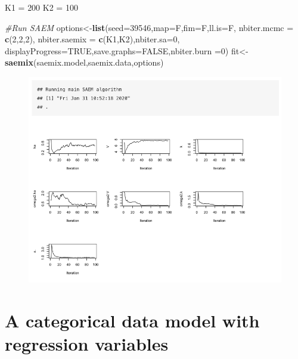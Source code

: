 \documentclass[]{book}
\newenvironment{Shaded}{\begin{snugshade}}{\end{snugshade}}
\newcommand{\KeywordTok}[1]{\textcolor[rgb]{0.13,0.29,0.53}{\textbf{{#1}}}}
\newcommand{\DataTypeTok}[1]{\textcolor[rgb]{0.13,0.29,0.53}{{#1}}}
\newcommand{\DecValTok}[1]{\textcolor[rgb]{0.00,0.00,0.81}{{#1}}}
\newcommand{\StringTok}[1]{\textcolor[rgb]{0.31,0.60,0.02}{{#1}}}
\newcommand{\CommentTok}[1]{\textcolor[rgb]{0.56,0.35,0.01}{\textit{{#1}}}}
\newcommand{\OtherTok}[1]{\textcolor[rgb]{0.56,0.35,0.01}{{#1}}}
\newcommand{\NormalTok}[1]{{#1}}
\begin{document}
\begin{Shaded}
\begin{Highlighting}[]
\NormalTok{K1 =}\StringTok{ }\DecValTok{200}
\NormalTok{K2 =}\StringTok{ }\DecValTok{100}


\CommentTok{#Run SAEM}
\NormalTok{options<-}\KeywordTok{list}\NormalTok{(}\DataTypeTok{seed=}\DecValTok{39546}\NormalTok{,}\DataTypeTok{map=}\NormalTok{F,}\DataTypeTok{fim=}\NormalTok{F,}\DataTypeTok{ll.is=}\NormalTok{F,}
  \DataTypeTok{nbiter.mcmc =} \KeywordTok{c}\NormalTok{(}\DecValTok{2}\NormalTok{,}\DecValTok{2}\NormalTok{,}\DecValTok{2}\NormalTok{), }\DataTypeTok{nbiter.saemix =} \KeywordTok{c}\NormalTok{(K1,K2),}\DataTypeTok{nbiter.sa=}\DecValTok{0}\NormalTok{,}
  \DataTypeTok{displayProgress=}\OtherTok{TRUE}\NormalTok{,}\DataTypeTok{save.graphs=}\OtherTok{FALSE}\NormalTok{,}\DataTypeTok{nbiter.burn =}\DecValTok{0}\NormalTok{)}
\NormalTok{fit<-}\KeywordTok{saemix}\NormalTok{(saemix.model,saemix.data,options)}
\end{Highlighting}
\end{Shaded}

\begin{figure}

{\centering \includegraphics[width=1\linewidth]{figures/resultcase1} 

}

\end{figure}

\section{A categorical data model with regression
variables}\label{a-categorical-data-model-with-regression-variables}
\end{document}
